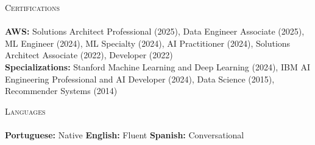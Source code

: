 \documentclass[a4paper]{article}
\newcommand{\lineunder} {
    \vspace*{-8pt} \\
    \hspace*{-18pt} \hrulefill \\
}
\newcommand{\header} [1] {
    {\hspace*{-18pt}\vspace*{6pt} \textsc{#1}}
    \vspace*{-6pt} \lineunder
}
\begin{document}
\header{Certifications}
\vspace{0.5mm}
\textbf{AWS:} Solutions Architect Professional (2025), Data Engineer Associate (2025), ML Engineer (2024), ML Specialty (2024), AI Practitioner (2024), Solutions Architect Associate (2022), Developer (2022) \\
\textbf{Specializations:} Stanford Machine Learning and Deep Learning (2024), IBM AI Engineering Professional and AI Developer (2024), Data Science (2015), Recommender Systems (2014)

\header{Languages}
\vspace{0.5mm}
\textbf{Portuguese:} Native \hfill \textbf{English:} Fluent \hfill \textbf{Spanish:} Conversational
\end{document}
